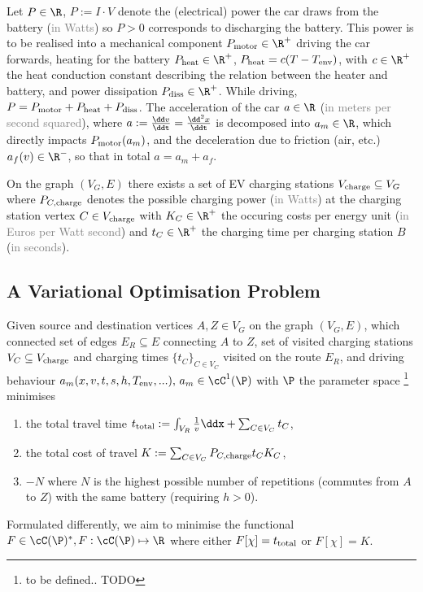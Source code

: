 \documentclass[12pt, a4paper]{article}
\begin{document}
  Let $P \in \R$, $P := I \cdot V$ denote the (electrical) power the car draws from the battery (\textcolor{gray}{in Watts}) so $P > 0$ corresponds to discharging the battery.
  This power is to be realised into a mechanical component $P_{\rm motor} \in \R^+$ driving the car forwards, heating for the battery $P_{\rm heat} \in \R^+$, $P_{\rm heat} = c (T - T_{\rm env})$, with $c \in \R^+$ the heat conduction constant describing the relation between the heater and battery, and power dissipation $P_{\rm diss} \in \R^+$.
  While driving, $P = P_{\rm motor} + P_{\rm heat} + P_{\rm diss}$.
  The acceleration of the car $a \in \R$ (\textcolor{gray}{in meters per second squared}), where $a := \frac{\dd v}{\ddt} = \frac{\dd^2 x}{\ddt}$ is decomposed into $a_m \in \R$, which directly impacts $P_{\rm motor}(a_m)$, and the deceleration due to friction (air, etc.) $a_f(v) \in \R^-$, so that in total $a = a_m + a_f$.

  On the graph $(V_G, E)$ there exists a set of EV charging stations $V_{\rm charge} \subseteq V_G$ where $P_{C,\rm charge}$ denotes the possible charging power (\textcolor{gray}{in Watts}) at the charging station vertex $C \in V_{\rm charge}$ with $K_C \in \R^+$ the occuring costs per energy unit (\textcolor{gray}{in Euros per Watt second}) and $t_C \in \R^+$ the charging time per charging station $B$ (\textcolor{gray}{in seconds}).

  \subsection{A Variational Optimisation Problem}
  Given source and destination vertices $A, Z \in V_G$ on the graph $(V_G, E)$, which connected set of edges $E_R \subseteq E$ connecting $A$ to $Z$,
  set of visited charging stations $V_C \subseteq V_{\rm charge}$ and charging times $\{t_C\}_{C \in V_C}$ visited on the route $E_R$, and driving behaviour $a_m(x, v, t, s, h, T_{\rm env}, ...),\, a_m \in \cC^1(\P)$ with $\P$ the parameter space \footnote{to be defined.. TODO} minimises
  \begin{enumerate}
    \item the total travel time $t_{\rm total} := \int_{V_R} \frac{1}{v} \ddx + \sum_{C \in V_C} t_C$,
    \item the total cost of travel $K := \sum_{C \in V_C} P_{C, \rm charge} t_{C} K_C$,
    \item $-N$ where $N$ is the highest possible number of repetitions (commutes from $A$ to $Z$) with the same battery (requiring $h > 0$).
  \end{enumerate}
  Formulated differently, we aim to minimise the functional
  $F \in \cC(\P)^*, F: \cC(\P) \mapsto \R$ where either $F[\chi] = t_{\rm total}$ or $F[\chi] = K$.
\end{document}
